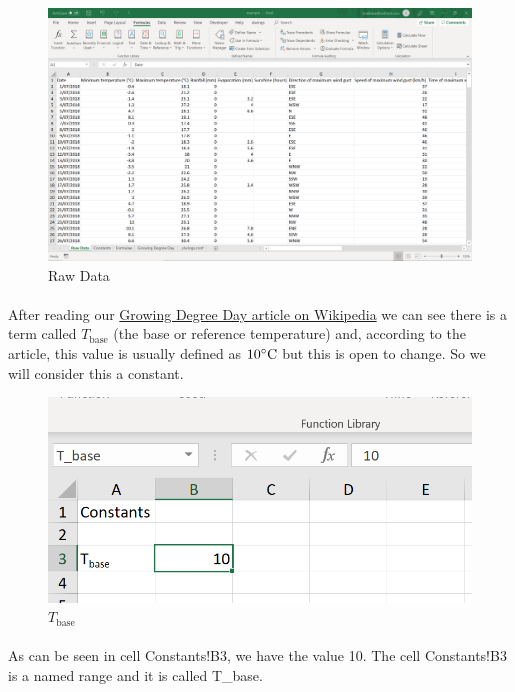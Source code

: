 \documentclass[12pt,a4paper,twoside,openright,titlepage]{article}
\begin{document}
\begin{figure}[h!]
	\centering
	\includegraphics[scale=0.3]{images/raw_data.PNG}
	\caption{Raw Data}
\end{figure}

\paragraph{} After reading our \href{https://en.wikipedia.org/wiki/Growing_degree-day}{Growing Degree Day article on Wikipedia} we can see there is a term called $T_{\textrm{base}}$ (the base or reference temperature) and, according to the article, this value is usually defined as $10\degree\textrm{C}$ but this is open to change. So we will consider this a constant. 

\begin{figure}[h!]
	\centering
	\includegraphics[scale=0.9]{images/t_base.PNG}
	\caption{$T_{\textrm{base}}$}
\end{figure}

\paragraph{} As can be seen in cell Constants!B3, we have the value 10. The cell Constants!B3 is a named range and it is called T\_base.
\end{document}
